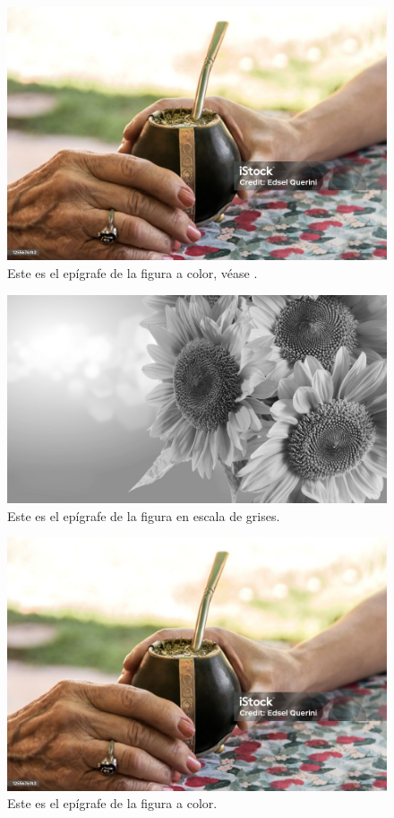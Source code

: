 \ifPDF%
\begin{figure}[!ht]
\centering
\includegraphics[width=\textwidth]{./media/imagen1.jpg}
\caption{Este es el epígrafe de la figura a color, véase \textcite{@3159-FUNES2006}.}
\end{figure}
\else
	\ifBNPDF%
	\begin{figure}[!ht]
	\centering
	\includegraphics[width=\textwidth]{./media/bn-imagen1.png}
	\caption{Este es el epígrafe de la figura en escala de grises.}
	\end{figure}
	\else
		\ifODT%
		\begin{figure}[!ht]
		\centering
		\includegraphics[width=\textwidth]{./media/imagen1.jpg}
		\caption{Este es el epígrafe de la figura a color.}
		\end{figure}
